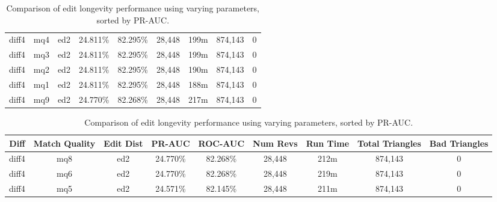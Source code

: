 \begin{sidewaystable}[!ph]
\begin{center}
\begin{tabular}{|c|c|c||c|c||c|c|c|c|}
diff4 & mq4 & ed2 & 24.811\% & 82.295\% & 28,448 & 199m & 874,143 & 0 \\
diff4 & mq3 & ed2 & 24.811\% & 82.295\% & 28,448 & 199m & 874,143 & 0 \\
diff4 & mq2 & ed2 & 24.811\% & 82.295\% & 28,448 & 190m & 874,143 & 0 \\
diff4 & mq1 & ed2 & 24.811\% & 82.295\% & 28,448 & 188m & 874,143 & 0 \\
diff4 & mq9 & ed2 & 24.770\% & 82.268\% & 28,448 & 217m & 874,143 & 0 \\
\hline
\end{tabular}
\end{center}
\caption{Comparison of edit longevity performance using
    varying parameters, sorted by PR-AUC.}
\label{tab:editshoutJ}
\end{sidewaystable}
\clearpage
\begin{sidewaystable}[!ph]
  \begin{center}
    \begin{tabular}{|c|c|c||c|c||c|c|c|c|}
\hline
Diff & Match Quality & Edit Dist
        & PR-AUC & ROC-AUC
        & Num Revs & Run Time
        & Total Triangles & Bad Triangles \\
\hline
\hline
diff4 & mq8 & ed2 & 24.770\% & 82.268\% & 28,448 & 212m & 874,143 & 0 \\
diff4 & mq6 & ed2 & 24.770\% & 82.268\% & 28,448 & 219m & 874,143 & 0 \\
diff4 & mq5 & ed2 & 24.571\% & 82.145\% & 28,448 & 211m & 874,143 & 0 \\
\hline
\end{tabular}
\end{center}
\caption{Comparison of edit longevity performance using
    varying parameters, sorted by PR-AUC.}
\label{tab:editshoutK}
\end{sidewaystable}
\clearpage
